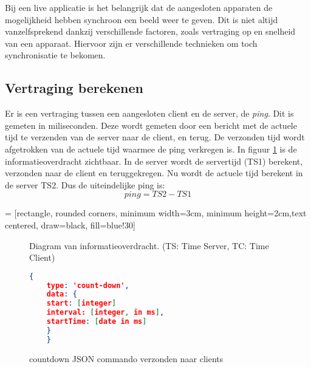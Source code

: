 Bij een live applicatie is het belangrijk dat de aangesloten apparaten de mogelijkheid hebben synchroon een beeld weer te geven. Dit is niet altijd vanzelfsprekend dankzij verschillende factoren, zoals vertraging op en snelheid van een apparaat. Hiervoor zijn er verschillende technieken om toch synchronisatie te bekomen.

\subsection{Vertraging berekenen}
Er is een vertraging tussen een aangesloten client en de server, de {\it ping}. Dit is gemeten in miliseconden.
Deze wordt gemeten door een bericht met de actuele tijd te verzenden van de server naar de client, en terug. De verzonden tijd wordt afgetrokken van de actuele tijd waarmee de ping verkregen is.
In figuur \ref{diag} is de informatieoverdracht zichtbaar. In de server wordt de servertijd (TS1) berekent, verzonden naar de client en teruggekregen.
Nu wordt de actuele tijd berekent in de server TS2. Dus de uiteindelijke ping is:
\[ping = TS2 - TS1\]

 = [rectangle, rounded corners, minimum width=3cm, minimum height=2cm,text centered, draw=black, fill=blue!30]


\begin{figure}
    \caption{Diagram van informatieoverdracht. (TS: Time Server, TC: Time Client)} \label{diag}
\end{figure}

\begin{figure}
    \begin{lstlisting}[language=json,firstnumber=1]
    {
    type: 'count-down',
    data: {
    start: [integer]
    interval: [integer, in ms],
    startTime: [date in ms]
    }
    }
    \end{lstlisting}
    \caption{countdown JSON commando verzonden naar clients} \label{json2}
\end{figure}

